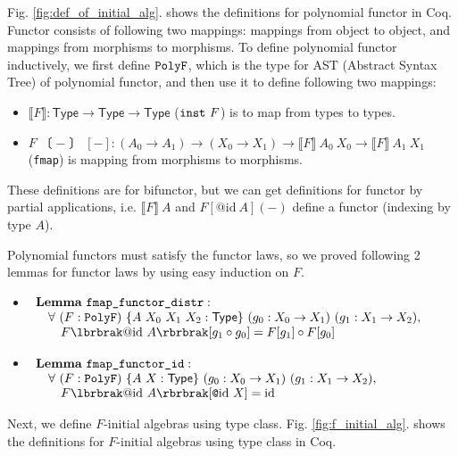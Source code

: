 \documentclass[runningheads, orivec]{llncs}
\begin{document}
Fig. \ref{fig:def_of_initial_alg}. shows the definitions for polynomial functor in Coq. Functor consists of following two mappings: mappings from object to object, and mappings from morphisms to morphisms. To define polynomial functor inductively, we first define \( \verb~PolyF~ \), which is the type for AST (Abstract Syntax Tree) of polynomial functor, and then use it to define following two mappings: 
\begin{itemize}
\item \( \llbracket F \rrbracket : \mathsf{Type} \to \mathsf{Type} \to \mathsf{Type}\)  (\( \verb~inst~~F \)) is to map from types to types. 
\item \( F\lbrbrak {-} \rbrbrak [{-}] \colon (A_0 \to A_1) \to (X_0 \to X_1) \to \llbracket F \rrbracket ~ A_0 ~ X_0 \to \llbracket F \rrbracket ~ A_1 ~ X_1 \)(\verb~fmap~) is mapping from morphisms to morphisms.
\end{itemize}
These definitions are for bifunctor, but we can get definitions for functor by partial applications, i.e. \( \llbracket F \rrbracket ~ A \) and \( F[@\mathrm{id}~A]({-}) \) define a functor (indexing by type \( A \)). 

Polynomial functors must satisfy the functor laws, so we proved following 2 lemmas for functor laws by using easy induction on \( F \). 
\begin{itemize}
\item 
\(\begin{array}[t]{l}
\mathbf{Lemma}~ \verb~fmap_functor_distr~ : \\
\quad \forall ~ (F : \verb~PolyF~) ~ \{ A ~ X_0 ~ X_1 ~ X_2 : \mathsf{Type} \} ~ (g_0 : X_0 \to X_1) ~ (g_1 : X_1 \to X_2), \\
\qquad F \lbrbrak @ \mathrm{id}~A \rbrbrak [g_1 \circ g_0] = F [g_1] \circ F [g_0]
\end{array}
\)

\item \(\begin{array}[t]{l}
\mathbf{Lemma}~ \verb~fmap_functor_id~ : \\
\quad \forall ~ (F : \verb~PolyF~) ~ \{ A ~ X : \mathsf{Type} \} ~ (g_0 : X_0 \to X_1) ~ (g_1 : X_1 \to X_2), \\
\qquad F \lbrbrak @ \mathrm{id}~A \rbrbrak [\verb~@~\mathrm{id}~X] = \mathrm{id}
\end{array}
\)
\end{itemize}

Next, we define \( F \)-initial algebras using type class. Fig. \ref{fig:f_initial_alg}. shows the definitions for \( F \)-initial algebras using type class in Coq.
\end{document}

